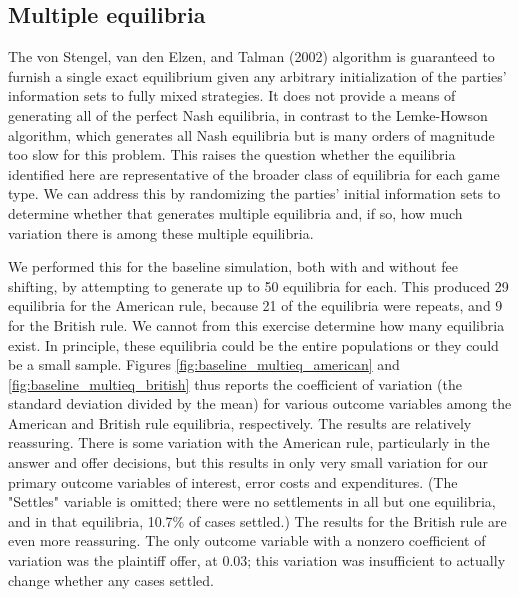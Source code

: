 \documentclass{article}
\begin{document}
\subsection{Multiple equilibria}

The von Stengel, van den Elzen, and Talman (2002) algorithm is guaranteed to furnish a single exact equilibrium given any arbitrary initialization of the parties' information sets to fully mixed strategies. It does not provide a means of generating all of the perfect Nash equilibria, in contrast to the Lemke-Howson algorithm, which generates all Nash equilibria but is many orders of magnitude too slow for this problem. This raises the question whether the equilibria identified here are representative of the broader class of equilibria for each game type. We can address this by randomizing the parties' initial information sets to determine whether that generates multiple equilibria and, if so, how much variation there is among these multiple equilibria.

We performed this for the baseline simulation, both with and without fee shifting, by attempting to generate up to 50 equilibria for each. This produced 29 equilibria for the American rule, because 21 of the equilibria were repeats, and 9 for the British rule. We cannot from this exercise determine how many equilibria exist. In principle, these equilibria could be the entire populations or they could be a small sample. Figures \ref{fig:baseline_multieq_american} and \ref{fig:baseline_multieq_british} thus reports the coefficient of variation (the standard deviation divided by the mean) for various outcome variables among the American and British rule equilibria, respectively. The results are relatively reassuring. There is some variation with the American rule, particularly in the answer and offer decisions, but this results in only very small variation for our primary outcome variables of interest, error costs and expenditures. (The "Settles" variable is omitted; there were no settlements in all but one equilibria, and in that equilibria, 10.7\% of cases settled.) The results for the British rule are even more reassuring. The only outcome variable with a nonzero coefficient of variation was the plaintiff offer, at 0.03; this variation was insufficient to actually change whether any cases settled. 
\end{document}

